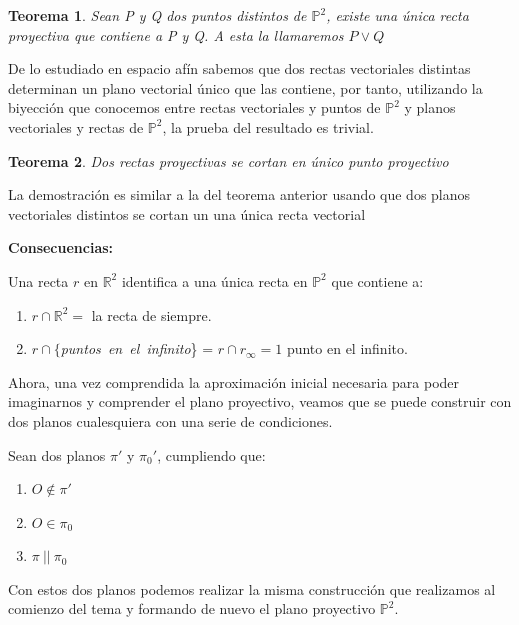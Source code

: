 \documentclass[11pt, a4paper]{article}
\makeatletter
\newif\IfInSansMode
\let\oldsf\sffamily
\renewcommand*{\sffamily}{\oldsf\mathversion{sans}\InSansModetrue}
\let\oldnorm\normalfont
\renewcommand*{\normalfont}{\oldnorm\InSansModefalse\mathversion{normal}}
\renewenvironment{proof}[1][\proofname] {\vspace{-15pt}\par\pushQED{\qed}\normalfont\topsep6\p@\@plus6\p@\relax\trivlist\item[\hskip\labelsep\it#1\@addpunct{.}]\ignorespaces}{\popQED\endtrivlist\@endpefalse}
\renewenvironment{proof}[1][\proofname] {\par\pushQED{\qed}\normalfont\topsep6\p@\@plus6\p@\relax\trivlist\item[\hskip\labelsep\itshape\sffamily#1\@addpunct{.}]\ignorespaces}{\popQED\endtrivlist\@endpefalse}
\theoremstyle{theorem-style}
\newtheorem{nth}{Teorema}[section]
\theoremstyle{definition-style}
\theoremstyle{remark-style}
\theoremstyle{example-style}
\newenvironment{nlist}
{\begin{enumerate}
    \renewcommand\labelenumi{(\emph{\roman{enumi})}}}
  {\end{enumerate}}
\makeatother
\begin{document}
\begin{nth}
Sean P y Q dos puntos distintos de $\mathbb{P}^2$, existe una única recta proyectiva que contiene a P y Q. A esta la llamaremos $P \vee Q$
\end{nth}
\begin{proof}

De lo estudiado en espacio afín sabemos que dos rectas vectoriales distintas determinan un plano vectorial único que las contiene, por tanto, utilizando la biyección que conocemos entre rectas vectoriales y puntos de $\mathbb{P}^2$ y planos vectoriales y rectas de $\mathbb{P}^2$, la prueba del resultado es trivial.
\end{proof}

\begin{nth}
Dos rectas proyectivas se cortan en único  punto proyectivo
\end{nth}
\begin{proof}
La demostración es similar a la del teorema anterior usando que dos planos vectoriales distintos se cortan un una única recta vectorial
\end{proof}

\textbf{Consecuencias:}

Una recta $r$ en $\mathbb{R}^2$ identifica a una única recta en $\mathbb{P}^2$ que contiene a:
\begin{nlist}

	\item $r \cap \mathbb{R}^2 =$ la recta de siempre. 
	\item $r \cap \{$\textit{puntos\ en\ el\ infinito}\} = $r \cap r_\infty = 1$ punto en el infinito.

\end{nlist}

Ahora, una vez comprendida la aproximación inicial necesaria para poder imaginarnos y comprender el plano proyectivo, veamos que se puede construir con dos planos cualesquiera con una serie de condiciones.


Sean dos planos $\pi'$ y $\pi_0'$, cumpliendo que:
\begin{nlist}
	\item $O \notin \pi'$
	\item $O \in \pi_0$
	\item $\pi\ ||\ \pi_0$ 
\end{nlist}
Con estos dos planos podemos realizar la misma construcción que realizamos al comienzo del tema y formando de nuevo el plano proyectivo $\mathbb{P}^2$. 
\end{document}
